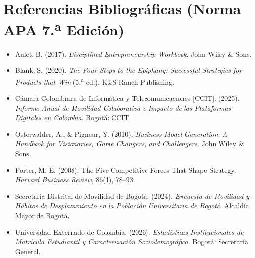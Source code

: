 \documentclass[11pt,a4paper]{article}
\begin{document}
\vspace{0.4cm}

\section*{Referencias Bibliogr\'aficas (Norma APA 7.\textsuperscript{a} Edici\'on)}

\begin{itemize}[leftmargin=*, label={}]
    \item Aulet, B. (2017). \textit{Disciplined Entrepreneurship Workbook}. John Wiley \& Sons.
    \item Blank, S. (2020). \textit{The Four Steps to the Epiphany: Successful Strategies for Products that Win} (5.\textsuperscript{a} ed.). K\&S Ranch Publishing.
    \item C\'amara Colombiana de Inform\'atica y Telecomunicaciones [CCIT]. (2025). \textit{Informe Anual de Movilidad Colaborativa e Impacto de las Plataformas Digitales en Colombia}. Bogot\'a: CCIT.
    \item Osterwalder, A., \& Pigneur, Y. (2010). \textit{Business Model Generation: A Handbook for Visionaries, Game Changers, and Challengers}. John Wiley \& Sons.
    \item Porter, M. E. (2008). The Five Competitive Forces That Shape Strategy. \textit{Harvard Business Review}, 86(1), 78--93.
    \item Secretar\'ia Distrital de Movilidad de Bogot\'a. (2024). \textit{Encuesta de Movilidad y H\'abitos de Desplazamiento en la Poblaci\'on Universitaria de Bogot\'a}. Alcald\'ia Mayor de Bogot\'a.
    \item Universidad Externado de Colombia. (2026). \textit{Estad\'isticas Institucionales de Matr\'icula Estudiantil y Caracterizaci\'on Sociodemogr\'afica}. Bogot\'a: Secretar\'ia General.
\end{itemize}
\end{document}

